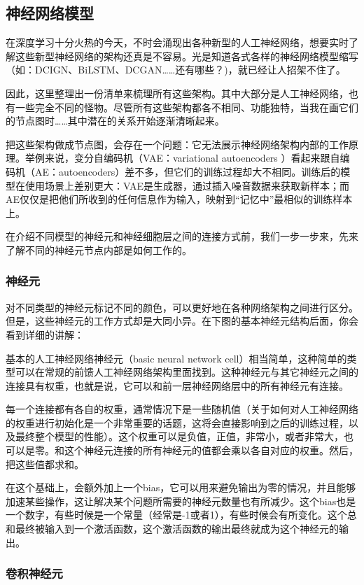 \subsection{神经网络模型}
在深度学习十分火热的今天，不时会涌现出各种新型的人工神经网络，想要实时了解这些新型神经网络的架构还真是不容易。光是知道各式各样的神经网络模型缩写（如：DCIGN、BiLSTM、DCGAN……还有哪些？)，就已经让人招架不住了。

因此，这里整理出一份清单来梳理所有这些架构。其中大部分是人工神经网络，也有一些完全不同的怪物。尽管所有这些架构都各不相同、功能独特，当我在画它们的节点图时……其中潜在的关系开始逐渐清晰起来。

把这些架构做成节点图，会存在一个问题：它无法展示神经网络架构内部的工作原理。举例来说，变分自编码机（VAE：variational autoencoders ）看起来跟自编码机（AE：autoencoders）差不多，但它们的训练过程却大不相同。训练后的模型在使用场景上差别更大：VAE是生成器，通过插入噪音数据来获取新样本；而AE仅仅是把他们所收到的任何信息作为输入，映射到“记忆中”最相似的训练样本上。

在介绍不同模型的神经元和神经细胞层之间的连接方式前，我们一步一步来，先来了解不同的神经元节点内部是如何工作的。
\subsubsection{神经元}
对不同类型的神经元标记不同的颜色，可以更好地在各种网络架构之间进行区分。但是，这些神经元的工作方式却是大同小异。在下图的基本神经元结构后面，你会看到详细的讲解：

基本的人工神经网络神经元（basic neural network cell）相当简单，这种简单的类型可以在常规的前馈人工神经网络架构里面找到。这种神经元与其它神经元之间的连接具有权重，也就是说，它可以和前一层神经网络层中的所有神经元有连接。

每一个连接都有各自的权重，通常情况下是一些随机值（关于如何对人工神经网络的权重进行初始化是一个非常重要的话题，这将会直接影响到之后的训练过程，以及最终整个模型的性能）。这个权重可以是负值，正值，非常小，或者非常大，也可以是零。和这个神经元连接的所有神经元的值都会乘以各自对应的权重。然后，把这些值都求和。

在这个基础上，会额外加上一个bias，它可以用来避免输出为零的情况，并且能够加速某些操作，这让解决某个问题所需要的神经元数量也有所减少。这个bias也是一个数字，有些时候是一个常量（经常是-1或者1），有些时候会有所变化。这个总和最终被输入到一个激活函数，这个激活函数的输出最终就成为这个神经元的输出。

\subsubsection{卷积神经元}

